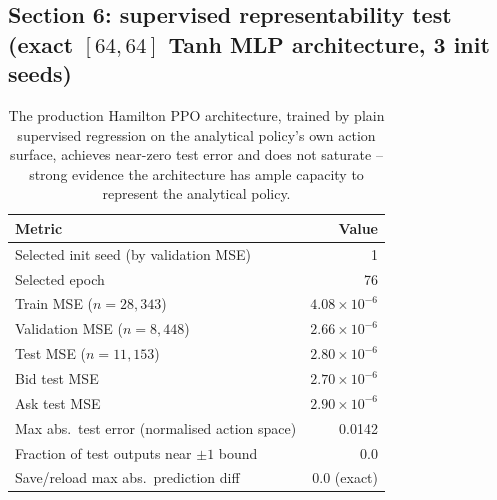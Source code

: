 \subsection*{Section 6: supervised representability test (exact $[64,64]$ Tanh MLP architecture, 3 init seeds)}
\begin{table}[h]
\centering
\begin{tabular}{lr}
\hline
Metric & Value \\
\hline
Selected init seed (by validation MSE) & 1 \\
Selected epoch & 76 \\
Train MSE ($n=28{,}343$) & $4.08\times10^{-6}$ \\
Validation MSE ($n=8{,}448$) & $2.66\times10^{-6}$ \\
Test MSE ($n=11{,}153$) & $2.80\times10^{-6}$ \\
Bid test MSE & $2.70\times10^{-6}$ \\
Ask test MSE & $2.90\times10^{-6}$ \\
Max abs.\ test error (normalised action space) & 0.0142 \\
Fraction of test outputs near $\pm1$ bound & 0.0 \\
Save/reload max abs.\ prediction diff & $0.0$ (exact) \\
\hline
\end{tabular}
\caption{The production Hamilton PPO architecture, trained by plain supervised regression on the
analytical policy's own action surface, achieves near-zero test error and does not saturate --
strong evidence the architecture has ample capacity to represent the analytical policy.}
\end{table}

